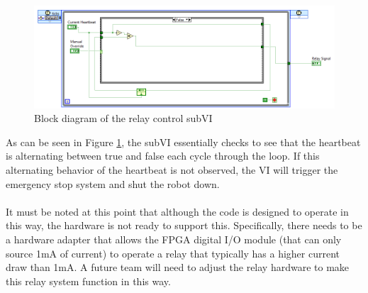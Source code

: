 \begin{figure}[h!]
\centering
\includegraphics[scale=0.55]{Photos/relaycontrolsubvi.png}
\caption{Block diagram of the relay control subVI}
\label{fig:relaycontrolsubvi}
\end{figure}

\noindent As can be seen in Figure \ref{fig:relaycontrolsubvi}, the subVI essentially checks to see that the heartbeat is alternating between true and false each cycle through the loop. If this alternating behavior of the heartbeat is not observed, the VI will trigger the emergency stop system and shut the robot down.\\ \\
%
It must be noted at this point that although the code is designed to operate in this way, the hardware is not ready to support this. Specifically, there needs to be a hardware adapter that allows the FPGA digital I/O module (that can only source 1mA of current) to operate a relay that typically has a higher current draw than 1mA. A future team will need to adjust the relay hardware to make this relay system function in this way. 